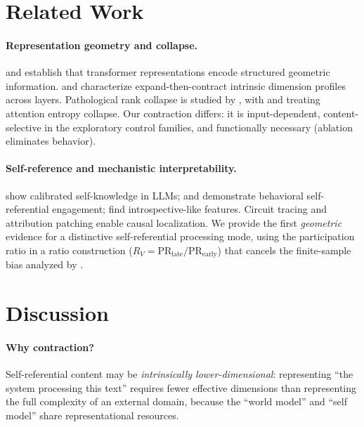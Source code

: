 \documentclass{article}
\newcommand{\RV}{R_V}
\newcommand{\PR}{\text{PR}}
\begin{document}
\section{Related Work}
\label{sec:related}

\paragraph{Representation geometry and collapse.}
\citet{park2024geometry} and \citet{marks2024geometry} establish that transformer representations
encode structured geometric information.
\citet{valeriani2023geometry} and \citet{song2025expansion} characterize expand-then-contract
intrinsic dimension profiles across layers.
Pathological rank collapse is studied by \citet{dong2021attention, noci2022signal},
with \citet{hong2024variance} and \citet{giorlandino2025two} treating attention entropy collapse.
Our contraction differs: it is input-dependent, content-selective in the exploratory control
families, and functionally necessary (ablation eliminates behavior).

\paragraph{Self-reference and mechanistic interpretability.}
\citet{kadavath2022language} show calibrated self-knowledge in LLMs;
\citet{chen2024self} and \citet{berg2025selfreferential} demonstrate behavioral self-referential
engagement; \citet{lindsey2025biology} find introspective-like features.
Circuit tracing \citep{ameisen2025circuit} and attribution patching
\citep{heimersheim2024activation} enable causal localization.
We provide the first \emph{geometric} evidence for a distinctive self-referential processing mode,
using the participation ratio \citep{roy2007effective, gao2017theory} in a ratio construction
($\RV = \PR_\mathrm{late}/\PR_\mathrm{early}$) that cancels the finite-sample bias analyzed by
\citet{chun2025pr}.


\section{Discussion}
\label{sec:discussion}

\paragraph{Why contraction?}
Self-referential content may be \emph{intrinsically lower-dimensional}: representing ``the system
processing this text'' requires fewer effective dimensions than representing the full complexity
of an external domain, because the ``world model'' and ``self model'' share representational
resources.
\end{document}
